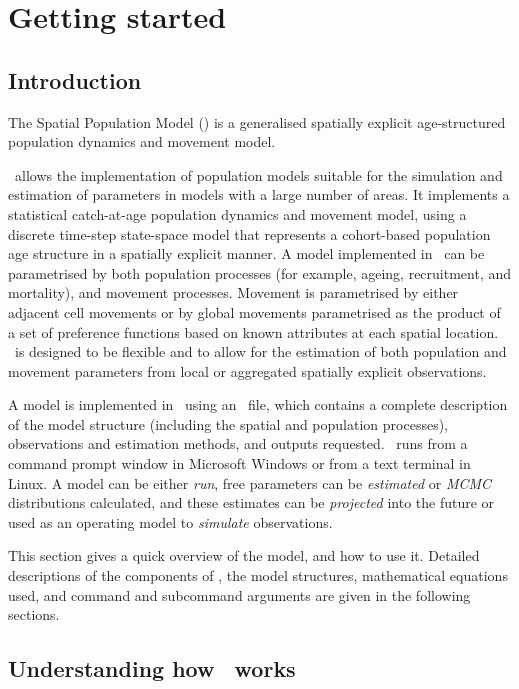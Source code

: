 \section{Getting started\label{sec:Getting-started}}

\subsection{Introduction}

The Spatial Population Model (\SPM) is a generalised spatially explicit age-structured population dynamics and movement model. 

\SPM\ allows the implementation of population models suitable for the simulation and estimation of parameters in models with a large number of areas. It implements a statistical catch-at-age population dynamics and movement model, using a discrete time-step state-space model that represents a cohort-based population age structure in a spatially explicit manner. A model implemented in \SPM\ can be parametrised by both population processes (for example, ageing, recruitment, and mortality), and movement processes. Movement is parametrised by either adjacent cell movements or by global movements parametrised as the product of a set of preference functions based on known attributes at each spatial location. \SPM\ is designed to be flexible and to allow for the estimation of both population and movement parameters from local or aggregated spatially explicit observations. 

A model is implemented in \SPM\ using an \config\ file, which contains a complete description of the model structure (including the spatial and population processes), observations and estimation methods, and outputs requested. \SPM\ runs from a command prompt window in Microsoft Windows or from a text terminal in Linux. A model can be either \emph{run}, free parameters can be \emph{estimated} or \emph{MCMC} distributions calculated, and these estimates can be \emph{projected} into the future or used as an operating model to \emph{simulate} observations.

This section gives a quick overview of the model, and how to use it. Detailed descriptions of the components of \SPM, the model structures, mathematical equations used, and command and subcommand arguments are given in the following sections.

\subsection{Understanding how \SPM\ works}

